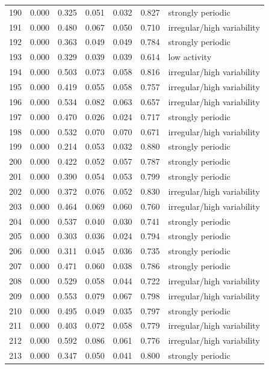 \begin{longtable}{lrrrrrl}
190 & 0.000 & 0.325 & 0.051 & 0.032 & 0.827 & strongly periodic \\
191 & 0.000 & 0.480 & 0.067 & 0.050 & 0.710 & irregular/high variability \\
192 & 0.000 & 0.363 & 0.049 & 0.049 & 0.784 & strongly periodic \\
193 & 0.000 & 0.329 & 0.039 & 0.039 & 0.614 & low activity \\
194 & 0.000 & 0.503 & 0.073 & 0.058 & 0.816 & irregular/high variability \\
195 & 0.000 & 0.419 & 0.055 & 0.058 & 0.757 & irregular/high variability \\
196 & 0.000 & 0.534 & 0.082 & 0.063 & 0.657 & irregular/high variability \\
197 & 0.000 & 0.470 & 0.026 & 0.024 & 0.717 & strongly periodic \\
198 & 0.000 & 0.532 & 0.070 & 0.070 & 0.671 & irregular/high variability \\
199 & 0.000 & 0.214 & 0.053 & 0.032 & 0.880 & strongly periodic \\
200 & 0.000 & 0.422 & 0.052 & 0.057 & 0.787 & strongly periodic \\
201 & 0.000 & 0.390 & 0.054 & 0.053 & 0.799 & strongly periodic \\
202 & 0.000 & 0.372 & 0.076 & 0.052 & 0.830 & irregular/high variability \\
203 & 0.000 & 0.464 & 0.069 & 0.060 & 0.760 & irregular/high variability \\
204 & 0.000 & 0.537 & 0.040 & 0.030 & 0.741 & strongly periodic \\
205 & 0.000 & 0.303 & 0.036 & 0.024 & 0.794 & strongly periodic \\
206 & 0.000 & 0.311 & 0.045 & 0.036 & 0.735 & strongly periodic \\
207 & 0.000 & 0.471 & 0.060 & 0.038 & 0.786 & strongly periodic \\
208 & 0.000 & 0.529 & 0.058 & 0.044 & 0.722 & irregular/high variability \\
209 & 0.000 & 0.553 & 0.079 & 0.067 & 0.798 & irregular/high variability \\
210 & 0.000 & 0.495 & 0.049 & 0.035 & 0.797 & strongly periodic \\
211 & 0.000 & 0.403 & 0.072 & 0.058 & 0.779 & irregular/high variability \\
212 & 0.000 & 0.592 & 0.086 & 0.061 & 0.776 & irregular/high variability \\
213 & 0.000 & 0.347 & 0.050 & 0.041 & 0.800 & strongly periodic \\

\end{longtable}
